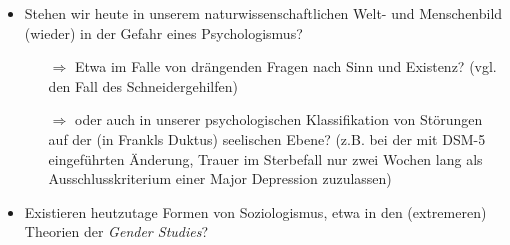 \documentclass{beamer}
\begin{document}
\begin{frame}
  
  \begin{itemize}
  \setlength{\itemsep}{10pt}
  
    \item Stehen wir heute in unserem naturwissenschaftlichen Welt- und Menschenbild (wieder) in der Gefahr eines Psychologismus?
    \begin{itemize}
    
      \pause    
    
      \item[$\Rightarrow$] Etwa im Falle von drängenden Fragen nach Sinn und Existenz? (vgl. den Fall des Schneidergehilfen)
      
      \pause      
      
      \item[$\Rightarrow$] oder auch in unserer psychologischen Klassifikation von Störungen auf der (in Frankls Duktus) seelischen Ebene? (z.B. bei der mit DSM-5 eingeführten Änderung, Trauer im Sterbefall nur zwei Wochen lang als Ausschlusskriterium einer Major Depression zuzulassen)
    \end{itemize}   
  
    \pause  
  
    \item Existieren heutzutage Formen von Soziologismus, etwa in den (extremeren) Theorien der \textit{Gender Studies}?   
  
  \end{itemize}    
  
\end{frame}


\begin{frame}
\printbibliography
\end{frame}
\end{document}
